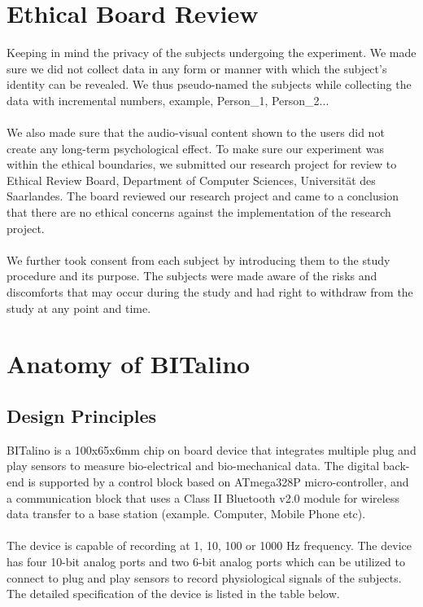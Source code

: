 
\section{Ethical Board Review}
Keeping in mind the privacy of the subjects undergoing the experiment. We made sure we did not collect data in any form or manner with which the subject’s identity can be revealed. We thus pseudo-named the subjects while collecting the data with incremental numbers, example, Person\_1, Person\_2...
\paragraph{}
We also made sure that the audio-visual content shown to the users did not create any long-term psychological effect. To make sure our experiment was within the ethical boundaries, we submitted our research project for review to Ethical Review Board, Department of Computer Sciences, Universität des Saarlandes. The board reviewed our research project and came to a conclusion that there are no ethical concerns against the implementation of the research project.
\paragraph{}
We further took consent from each subject by introducing them to the study procedure and its purpose. The subjects were made aware of the risks and discomforts that may occur during the study and had right to withdraw from the study at any point and time.

\section{Anatomy of BITalino}
\subsection{Design Principles}
BITalino is a 100x65x6mm chip on board device that integrates multiple plug and play sensors to measure bio-electrical and bio-mechanical data. The digital back-end is supported by a control block based on ATmega328P micro-controller, and a communication block that uses a Class II Bluetooth v2.0 module for wireless data transfer to a base station (example. Computer, Mobile Phone etc).\cite{silva_bitalino:_2014}
\paragraph{}
The device is capable of recording at 1, 10, 100 or 1000 Hz frequency. The device has four 10-bit analog ports and two 6-bit analog ports which can be utilized to connect to plug and play sensors to record physiological signals of the subjects. The detailed specification of the device is listed in the table below.
